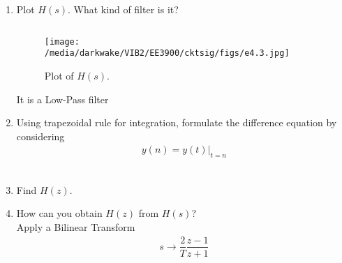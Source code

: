 \documentclass[journal,12pt,twocolumn]{IEEEtran}
\renewcommand\thesection{\arabic{section}}
\begin{document}
\begin{enumerate}[label=\arabic*.,ref=\thesection.\theenumi]
\item Plot $H(s)$.  What kind of filter is it?\\
\begin{lstlisting}
\end{lstlisting}
\begin{figure}[!ht]
	\texttt{[image: /media/darkwake/VIB2/EE3900/cktsig/figs/e4.3.jpg]}
	\caption{Plot of $H(s)$.}
	\label{fig:Hs}
\end{figure}
It is a Low-Pass filter\\
\item Using trapezoidal rule for integration, formulate the difference equation
by considering 
\begin{align}
	y(n) = y(t)\vert_{t=n}
\end{align}
\solution\\
\item Find $H(z)$.
\item How can you obtain $H(z)$ from $H(s)$?
\solution\\
Apply a Bilinear Transform
\begin{align}
	s \rightarrow \dfrac{2}{T}\dfrac{z-1}{z+1}
\end{align}
\end{enumerate}
\end{document}
